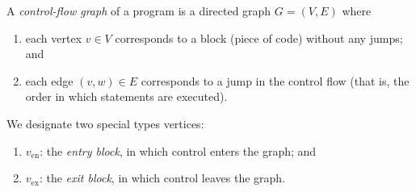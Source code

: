 \begin{definition}
    A \emph{control-flow graph} of a program is a directed graph $G = (V,E)$ where
    \begin{enumerate}
        \item each vertex $v \in V$ corresponds to a block (piece of code) without any jumps; and
        \item each edge $(v,w) \in E$ corresponds to a jump in the control flow (that is, the order in which statements are executed).
    \end{enumerate}
    We designate two special types vertices:
    \begin{enumerate}
        \item $v_{\text{en}}$: the \emph{entry block}, in which control enters the graph; and
        \item $v_{\text{ex}}$: the \emph{exit block}, in which control leaves the graph.
    \end{enumerate}
\end{definition}

